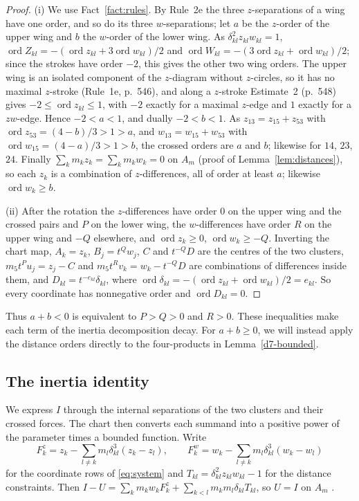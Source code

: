 \documentclass[Threeside,11pt]{article}
\theoremstyle{definition}
\theoremstyle{remark}
\numberwithin{equation}{section}
\theoremstyle{remark}
\newcommand{\ord}{\operatorname{ord}}
\begin{document}
\begin{proof}
(i) We use Fact~\ref{fact:rules}.  By Rule~2e \cite[p.~552]{AK} the three $z$-separations of a
wing have one order, and so do its three $w$-separations; let $a$ be the $z$-order of the upper
wing and $b$ the $w$-order of the lower wing.  As $\delta_{kl}^2z_{kl}w_{kl}=1$,
$\ord Z_{kl}=-(\ord z_{kl}+3\ord w_{kl})/2$ and $\ord W_{kl}=-(3\ord z_{kl}+\ord w_{kl})/2$;
since the strokes have order $-2$, this gives the other two wing orders.  The upper wing is an
isolated component of the $z$-diagram without $z$-circles, so it has no maximal $z$-stroke
(Rule~1e, p.~546), and along a $z$-stroke Estimate~2 (p.~548) gives $-2\le\ord z_{kl}\le1$, with
$-2$ exactly for a maximal $z$-edge and $1$ exactly for a $zw$-edge.  Hence $-2<a<1$, and dually
$-2<b<1$.  As $z_{13}=z_{15}+z_{53}$
with $\ord z_{53}=(4-b)/3>1>a$, and $w_{13}=w_{15}+w_{53}$ with $\ord w_{15}=(4-a)/3>1>b$, the
crossed orders are $a$ and $b$; likewise for $14$, $23$, $24$.  Finally
$\sum_km_kz_k=\sum_km_kw_k=0$ on $A_m$ (proof of Lemma~\ref{lem:distances}), so each $z_k$ is a
combination of $z$-differences, all of order at least $a$; likewise $\ord w_k\ge b$.

(ii) After the rotation the $z$-differences have order $0$ on the upper wing and the crossed
pairs and $P$ on the lower wing, the $w$-differences have order $R$ on the upper wing and $-Q$
elsewhere, and $\ord z_k\ge0$, $\ord w_k\ge-Q$.  Inverting the chart map, $A_k=z_k$,
$B_j=t^Qw_j$, $C$ and $t^{-Q}D$ are the centres of the two clusters, $m_5t^Pu_j=z_j-C$ and
$m_5t^Rv_k=w_k-t^{-Q}D$ are combinations of differences inside them, and
$D_{kl}=t^{-e_{kl}}\delta_{kl}$, where $\ord\delta_{kl}=-(\ord z_{kl}+\ord w_{kl})/2=e_{kl}$.  So
every coordinate has nonnegative order and $\ord D_{kl}=0$.
\end{proof}

Thus $a+b<0$ is equivalent to $P>Q>0$ and $R>0$.
These inequalities make each term of the inertia decomposition decay.
For $a+b\ge0$, we will instead apply the distance orders directly to the
four-products in Lemma~\ref{d7-bounded}.

\subsection{The inertia identity}
We express $I$ through the internal separations of the two clusters and their
crossed forces.  The chart then converts each summand into a positive power
of the parameter times a bounded function.
Write
\[
  F^z_k=z_k-\sum_{l\ne k}m_l\delta_{kl}^3(z_k-z_l),\qquad
  F^w_k=w_k-\sum_{l\ne k}m_l\delta_{kl}^3(w_k-w_l)
\]
for the coordinate rows of \eqref{eq:system} and $T_{kl}=\delta_{kl}^2z_{kl}w_{kl}-1$ for the
distance constraints.  Then $I-U=\sum_km_kw_kF^z_k+\sum_{k<l}m_km_l\delta_{kl}T_{kl}$, so $U=I$ on $A_m$
\cite[p.~541]{AK}.
\end{document}
